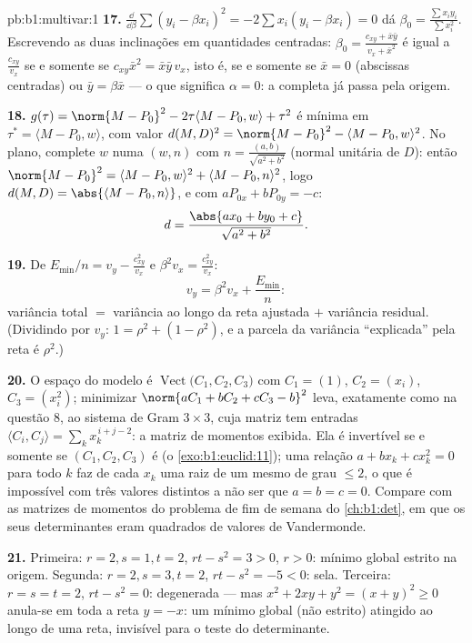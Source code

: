 \begin{solution}{pb:b1:multivar:1}
\textbf{17.} $\frac{\dd}{\dd\beta}\sum(y_i - \beta x_i)^2 =
-2\sum x_i(y_i - \beta x_i) = 0$ dá $\beta_0 = \frac{\sum
x_iy_i}{\sum x_i^2}$. Escrevendo as duas inclinações em
quantidades centradas: $\beta_0 = \frac{c_{xy} + \bar x\bar y}{v_x + \bar
x^2}$ é igual a $\frac{c_{xy}}{v_x}$ se e somente se $c_{xy}\bar x^2 = \bar
x\bar y\,v_x$,
isto é, se e somente se $\bar x = 0$ (abscissas centradas) ou $\bar y = \beta\bar x$ --- o
que significa $\alpha = 0$: a  completa já passa pela
origem.

\textbf{18.} $g(\tau) = \norm{M - P_0}^2 - 2\tau\langle M - P_0,
w\rangle + \tau^2$ é mínima em $\tau^* = \langle M - P_0,
w\rangle$, com valor $d(M,D)^2 = \norm{M - P_0}^2 - \langle M -
P_0, w\rangle^2$. No plano,
complete $w$ numa   $(w, n)$ com $n = \frac{(a, b)}{\sqrt{a^2+b^2}}$ (normal unitária
de $D$): então $\norm{M - P_0}^2 = \langle M - P_0,
w\rangle^2 + \langle M - P_0, n\rangle^2$, logo $d(M, D) =
\abs{\langle M - P_0, n\rangle}$, e com $aP_{0x} + bP_{0y} =
-c$:
\[
d = \frac{\abs{a x_0 + b y_0 + c}}{\sqrt{a^2 + b^2}} .
\]

\textbf{19.} De $E_{\min}/n = v_y - \frac{c_{xy}^2}{v_x}$ e $\beta^2 v_x = \frac{c_{xy}^2}{v_x}$:
\[
v_y = \beta^2 v_x + \frac{E_{\min}}n :
\]
variância total $=$ variância ao longo da reta ajustada $+$ variância
residual. (Dividindo por $v_y$: $1 = \rho^2 + (1 - \rho^2)$, e a parcela da variância
``explicada'' pela reta é $\rho^2$.)

\textbf{20.} O espaço do modelo é $\operatorname{Vect}\bigl(C_1, C_2, C_3\bigr)$ com $C_1 = (1)$, $C_2 = (x_i)$, $C_3 = (x_i^2)$;
minimizar $\norm{aC_1 + bC_2 +
cC_3 - b}^2$ leva, exatamente como na questão 8, ao sistema de
Gram $3\times3$, cuja matriz tem entradas $\langle C_i, C_j\rangle =
\sum_k x_k^{\,i+j-2}$: a matriz de momentos
exibida. Ela é invertível se e somente se $(C_1, C_2, C_3)$ é  (o \cref{exo:b1:euclid:11});
uma relação $a + bx_k + cx_k^2 = 0$ para todo $k$ faz de cada $x_k$ uma raiz de um
mesmo  de grau $\leq 2$, o que é impossível com três valores
distintos a não ser que $a
= b = c = 0$. Compare com as matrizes de momentos
do problema de fim de semana do \cref{ch:b1:det}, em que os seus determinantes
eram quadrados de valores de Vandermonde.

\textbf{21.} Primeira: $r = 2, s = 1, t = 2$, $rt - s^2 = 3 > 0$, $r > 0$: mínimo global estrito
na origem. Segunda: $r = 2, s
= 3, t = 2$, $rt - s^2 = -5 < 0$: sela. Terceira: $r = s = t =
2$, $rt - s^2 = 0$:
degenerada --- mas $x^2 + 2xy + y^2 = (x +
y)^2 \geq 0$ anula-se em toda a reta $y = -x$: um mínimo
global (não estrito) atingido ao longo de uma reta, invisível para o
teste do determinante.


\end{solution}
